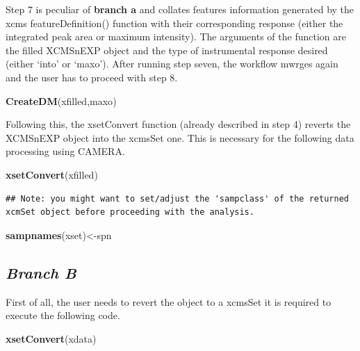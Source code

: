 \documentclass[
]{article}
\newenvironment{Shaded}{\begin{snugshade}}{\end{snugshade}}
\newcommand{\KeywordTok}[1]{\textcolor[rgb]{0.13,0.29,0.53}{\textbf{#1}}}
\newcommand{\NormalTok}[1]{#1}
\newcommand{\StringTok}[1]{\textcolor[rgb]{0.31,0.60,0.02}{#1}}
\begin{document}
Step 7 is peculiar of \textbf{branch a} and collates features
information generated by the xcms featureDefinition() function with
their corresponding response (either the integrated peak area or maximum
intensity). The arguments of the function are the filled XCMSnEXP object
and the type of instrumental response desired (either `into' or `maxo').
After running step seven, the workflow mwrges again and the user has to
proceed with step 8.

\begin{Shaded}
\begin{Highlighting}[]
\KeywordTok{CreateDM}\NormalTok{(xfilled,}\StringTok{\textquotesingle{}maxo\textquotesingle{}}\NormalTok{)}
\end{Highlighting}
\end{Shaded}

Following this, the xsetConvert function (already described in step 4)
reverts the XCMSnEXP object into the xcmsSet one. This is necessary for
the following data processing using CAMERA.

\begin{Shaded}
\begin{Highlighting}[]
\KeywordTok{xsetConvert}\NormalTok{(xfilled)}
\end{Highlighting}
\end{Shaded}

\begin{verbatim}
## Note: you might want to set/adjust the 'sampclass' of the returned xcmSet object before proceeding with the analysis.
\end{verbatim}

\begin{Shaded}
\begin{Highlighting}[]
\KeywordTok{sampnames}\NormalTok{(xset)<{-}spn}
\end{Highlighting}
\end{Shaded}

\hypertarget{branch-b}{%
\subsection{\texorpdfstring{\emph{Branch B}}{Branch B}}\label{branch-b}}

First of all, the user needs to revert the object to a xcmsSet it is
required to execute the following code.

\begin{Shaded}
\begin{Highlighting}[]
\KeywordTok{xsetConvert}\NormalTok{(xdata)}
\end{Highlighting}
\end{Shaded}
\end{document}
